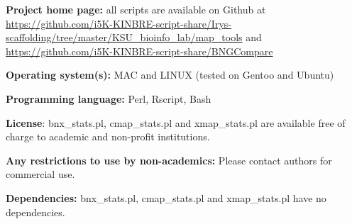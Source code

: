 \documentclass{bmcart}
\begin{document}
\textbf{Project home page:} all scripts are available on Github at \url{https://github.com/i5K-KINBRE-script-share/Irys-scaffolding/tree/master/KSU\_bioinfo\_lab/map\_tools} and \url{https://github.com/i5K-KINBRE-script-share/BNGCompare}

\textbf{Operating system(s):} MAC and LINUX (tested on Gentoo and Ubuntu)

\textbf{Programming language:} Perl, Rscript, Bash

\textbf{License}: bnx\_stats.pl, cmap\_stats.pl and xmap\_stats.pl are available free of charge to academic and non-profit institutions.

\textbf{Any restrictions to use by non-academics:} Please contact authors for commercial use.

\textbf{Dependencies:} bnx\_stats.pl, cmap\_stats.pl and xmap\_stats.pl have no dependencies.

\end{document}
